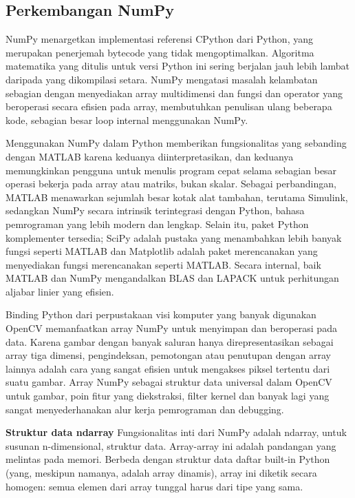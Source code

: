 \subsection{Perkembangan NumPy}
NumPy menargetkan implementasi referensi CPython dari Python, yang merupakan penerjemah bytecode yang tidak mengoptimalkan. Algoritma matematika yang ditulis untuk versi Python ini sering berjalan jauh lebih lambat daripada yang dikompilasi setara. NumPy mengatasi masalah kelambatan sebagian dengan menyediakan array multidimensi dan fungsi dan operator yang beroperasi secara efisien pada array, membutuhkan penulisan ulang beberapa kode, sebagian besar loop internal menggunakan NumPy.

Menggunakan NumPy dalam Python memberikan fungsionalitas yang sebanding dengan MATLAB karena keduanya diinterpretasikan, dan keduanya memungkinkan pengguna untuk menulis program cepat selama sebagian besar operasi bekerja pada array atau matriks, bukan skalar. Sebagai perbandingan, MATLAB menawarkan sejumlah besar kotak alat tambahan, terutama Simulink, sedangkan NumPy secara intrinsik terintegrasi dengan Python, bahasa pemrograman yang lebih modern dan lengkap. Selain itu, paket Python komplementer tersedia; SciPy adalah pustaka yang menambahkan lebih banyak fungsi seperti MATLAB dan Matplotlib adalah paket merencanakan yang menyediakan fungsi merencanakan seperti MATLAB. Secara internal, baik MATLAB dan NumPy mengandalkan BLAS dan LAPACK untuk perhitungan aljabar linier yang efisien.

Binding Python dari perpustakaan visi komputer yang banyak digunakan OpenCV memanfaatkan array NumPy untuk menyimpan dan beroperasi pada data. Karena gambar dengan banyak saluran hanya direpresentasikan sebagai array tiga dimensi, pengindeksan, pemotongan atau penutupan dengan array lainnya adalah cara yang sangat efisien untuk mengakses piksel tertentu dari suatu gambar. Array NumPy sebagai struktur data universal dalam OpenCV untuk gambar, poin fitur yang diekstraksi, filter kernel dan banyak lagi yang sangat menyederhanakan alur kerja pemrograman dan debugging.

\textbf{Struktur data ndarray}
\newline
Fungsionalitas inti dari NumPy adalah ndarray, untuk susunan n-dimensional, struktur data. Array-array ini adalah pandangan yang melintas pada memori. Berbeda dengan struktur data daftar built-in Python (yang, meskipun namanya, adalah array dinamis), array ini diketik secara homogen: semua elemen dari array tunggal harus dari tipe yang sama.

